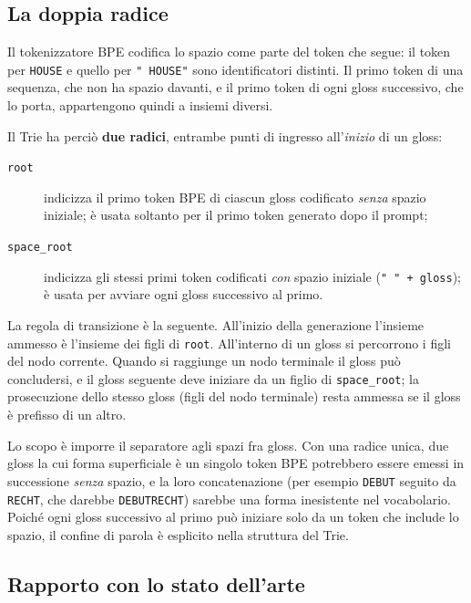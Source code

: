 \subsection{La doppia radice}
\label{sec:trie-dual-root}

Il tokenizzatore BPE codifica lo spazio come parte del token che segue: il token
per \texttt{HOUSE} e quello per \texttt{" HOUSE"} sono
identificatori distinti. Il primo token di una sequenza, che non ha spazio
davanti, e il primo token di ogni gloss successivo, che lo porta, appartengono
quindi a insiemi diversi.

Il Trie ha perciò \textbf{due radici}, entrambe punti di ingresso all'\emph{inizio}
di un gloss:
\begin{description}
  \item[\texttt{root}] indicizza il primo token BPE di ciascun gloss codificato
        \emph{senza} spazio iniziale; è usata soltanto per il primo token
        generato dopo il prompt;
  \item[\texttt{space\_root}] indicizza gli stessi primi token codificati
        \emph{con} spazio iniziale (\texttt{" " + gloss}); è usata per avviare
        ogni gloss successivo al primo.
\end{description}

La regola di transizione è la seguente. All'inizio della generazione l'insieme
ammesso è l'insieme dei figli di \texttt{root}. All'interno di un gloss si
percorrono i figli del nodo corrente. Quando si raggiunge un nodo terminale il
gloss può concludersi, e il gloss seguente deve iniziare da un figlio di
\texttt{space\_root}; la prosecuzione dello stesso gloss (figli del nodo
terminale) resta ammessa se il gloss è prefisso di un altro.

Lo scopo è imporre il separatore agli spazi fra gloss. Con una radice unica,
due gloss la cui forma superficiale è un singolo token BPE potrebbero essere
emessi in successione \emph{senza} spazio, e la loro concatenazione
(per esempio \texttt{DEBUT} seguito da \texttt{RECHT}, che darebbe
\texttt{DEBUTRECHT}) sarebbe una forma inesistente nel vocabolario. Poiché ogni
gloss successivo al primo può iniziare solo da un token che include lo spazio,
il confine di parola è esplicito nella struttura del Trie.

\subsection{Rapporto con lo stato dell'arte}

